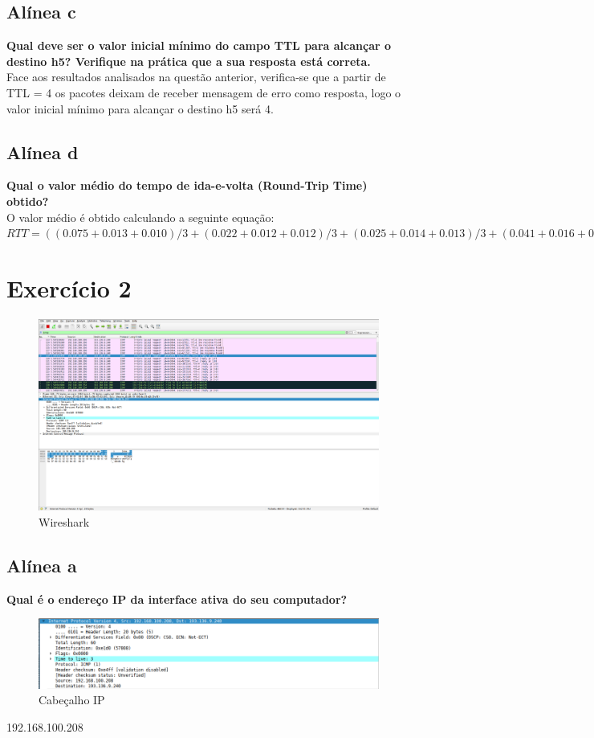 \documentclass[a4paper]{report}
\begin{document}
\subsection{Alínea c}
\textbf{Qual deve ser o valor inicial mínimo do campo TTL para alcançar o
destino h5? Verifique na prática que a sua resposta está correta.}\\
Face aos resultados analisados na questão anterior, verifica-se que a partir de
TTL = 4 os pacotes deixam de receber mensagem de erro como resposta, logo o
valor inicial mínimo para alcançar o destino h5 será 4.

\subsection{Alínea d}
\textbf{Qual o valor médio do tempo de ida-e-volta (Round-Trip Time) obtido?}\\
O valor médio é obtido calculando a seguinte equação:
\begin{math}
RTT = ((0.075 + 0.013 + 0.010) / 3 + (0.022 + 0.012 + 0.012) / 3 + (0.025 +
0.014 + 0.013) / 3 + (0.041 + 0.016 + 0.015) / 3) * 2 = 0.178
\end{math}

\section{Exercício 2}

\begin{figure}[H]
    \centering 
    \includegraphics[width=\textwidth]{images/wiresharkEx2.png}  
    \caption{Wireshark}
    \label{fig:wiresharkEx2}
\end{figure}

\subsection{Alínea a}
\textbf{Qual é o endereço IP da interface ativa do seu computador?}
\begin{figure}[H]
    \centering 
    \includegraphics[width=\textwidth]{images/ipEx2.png}
    \caption{Cabeçalho IP}
    \label{fig:ipEx2}
\end{figure}
192.168.100.208
\end{document}
